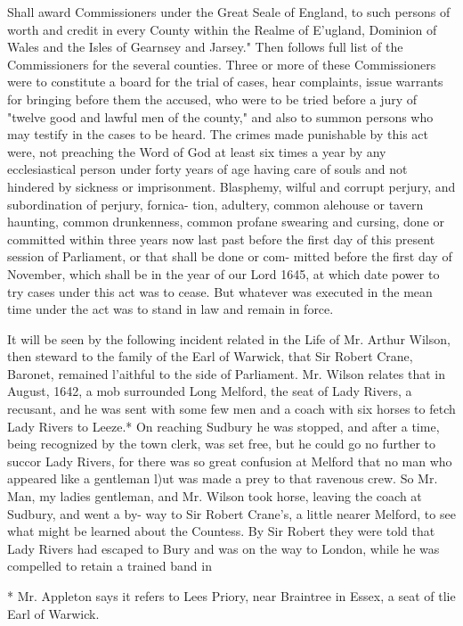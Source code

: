 \documentclass[oneside]{book}
\begin{document}
Shall award Commissioners under the Great Seale of England, 
to such persons of worth and credit in every County within the 
Realme of E'ugland, Dominion of Wales and the Isles of Gearnsey 
and Jarsey." Then follows full list of the Commissioners for the 
several counties. Three or more of these Commissioners were to 
constitute a board for the trial of cases, hear complaints, issue 
warrants for bringing before them the accused, who were to be 
tried before a jury of "twelve good and lawful men of the 
county," and also to summon persons who may testify in the 
cases to be heard. The crimes made punishable by this act were, 
not preaching the Word of God at least six times a year by any 
ecclesiastical person under forty years of age having care of souls 
and not hindered by sickness or imprisonment. Blasphemy, 
wilful and corrupt perjury, and subordination of perjury, fornica- 
tion, adultery, common alehouse or tavern haunting, common 
drunkenness, common profane swearing and cursing, done or 
committed within three years now last past before the first day of 
this present session of Parliament, or that shall be done or com- 
mitted before the first day of November, which shall be in the 
year of our Lord 1645, at which date power to try cases under 
this act was to cease. But whatever was executed in the mean 
time under the act was to stand in law and remain in force. 

It will be seen by the following incident related in the Life of 
Mr. Arthur Wilson, then steward to the family of the Earl of 
Warwick, that Sir Robert Crane, Baronet, remained l'aithful to 
the side of Parliament. Mr. Wilson relates that in August, 1642, 
a mob surrounded Long Melford, the seat of Lady Rivers, a 
recusant, and he was sent with some few men and a coach with 
six horses to fetch Lady Rivers to Leeze.* On reaching Sudbury 
he was stopped, and after a time, being recognized by the town 
clerk, was set free, but he could go no further to succor Lady 
Rivers, for there was so great confusion at Melford that no man 
who appeared like a gentleman l)ut was made a prey to that 
ravenous crew. So Mr. Man, my ladies gentleman, and Mr. 
Wilson took horse, leaving the coach at Sudbury, and went a by- 
way to Sir Robert Crane's, a little nearer Melford, to see what 
might be learned about the Countess. By Sir Robert they were 
told that Lady Rivers had escaped to Bury and was on the way 
to London, while he was compelled to retain a trained band in 



* Mr. Appleton says it refers to Lees Priory, near Braintree in Essex, 
a seat of tlie Earl of Warwick. 
\end{document}
